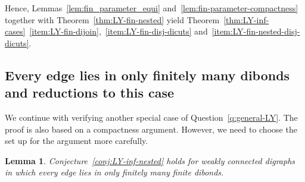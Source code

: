 \documentclass[reqno, 12pt]{amsart}
\numberwithin{equation}{section}
\numberwithin{figure}{section}
\theoremstyle{plain}
\newtheorem{lemma}[thm]{Lemma}
\theoremstyle{definition}
\begin{document}
Hence, Lemmas~\ref{lem:fin_parameter_equi} and~\ref{lem:fin-parameter-compactness} together with Theorem~\ref{thm:LY-fin-nested} yield Theorem~\ref{thm:LY-inf-cases}~\ref{item:LY-fin-dijoin},~\ref{item:LY-fin-disj-dicuts} and~\ref{item:LY-fin-nested-disj-dicuts}.






\subsection{Every edge lies in only finitely many dibonds and reductions to this case}

We continue with verifying another special case of Question~\ref{q:general-LY}.
The proof is also based on a compactness argument.
However, we need to choose the set up for the argument more carefully.


\begin{lemma}
    \label{L-Y-fin_many_fin_dibonds}
    Conjecture~\ref{conj:LY-inf-nested} holds for weakly connected digraphs in which every edge lies in only finitely many finite dibonds.
\end{lemma}
\end{document}

